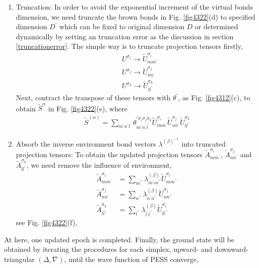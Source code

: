 \begin{enumerate}
	\item Truncation: In order to avoid the exponential increment of the virtual bonds dimension, we need truncate the brown bonds in Fig. \ref{fig4322}(d) to specified dimension $D^{\prime}$ which can be fixed to original dimension $D$ or determined dynamically by setting an truncation error as the discussion in section \ref{truncationerror}. The simple way is to truncate projection tensors firstly,  
		\begin{align}
			&U^{\sigma_i} \rightarrow \widetilde{U}^{\sigma_i}_{mm^{\prime}} \\
			&U^{\sigma_j} \rightarrow \widetilde{U}^{\sigma_j}_{nn^{\prime}} \\
			&U^{\sigma_k} \rightarrow \widetilde{U}^{\sigma_k}_{ll^{\prime}}
		\end{align}
		Next, contract the transpose of these tensors with $\theta^{\prime}$, as Fig. \ref{fig4312}(c), to obtain $\widetilde{S}^{\alpha}$ in Fig. \ref{fig4322}(e), where
		\begin{align}
			\widetilde{S}^{(\alpha)} = \sum_{m^{\prime}n^{\prime}l^{\prime}}{\theta_{m^{\prime} n^{\prime} l^{\prime}}^{\prime \sigma_i \sigma_j \sigma_k} \widetilde{U}^{\sigma_i}_{mm^{\prime}} \widetilde{U}^{\sigma_j}_{nn^{\prime}} \widetilde{U}^{\sigma_k}_{ll^{\prime}}}
		\end{align}
	\item Absorb the inverse environment bond vectors $\lambda^{(\beta)^{-1}}$ into truncated projection tensors: To obtain the updated projection tensors $\widetilde{A}^{\sigma_i}_{mm^{\prime}}$, $\widetilde{A}^{\sigma_j}_{nn^{\prime}}$ and $\widetilde{A}^{\sigma_k}_{ll^{\prime}}$, we need remove the influence of environment, 
		\begin{align}
			\widetilde{A}^{\sigma_i}_{mm^{\prime}} &= \sum_{m^{\prime \prime}}{ \lambda^{(\beta)}_{m^{\prime} m^{\prime \prime}} \widetilde{U}^{\sigma_i}_{mm^{\prime \prime}}} \\
			\widetilde{A}^{\sigma_j}_{nn^{\prime}} &= \sum_{n^{\prime \prime}}{ \lambda^{(\beta)}_{n^{\prime} n^{\prime \prime}} \widetilde{U}^{\sigma_j}_{nn^{\prime \prime}}} \\
			\widetilde{A}^{\sigma_k}_{ll^{\prime}} &= \sum_{l^{\prime \prime}}{ \lambda^{(\beta)}_{l^{\prime} l^{\prime \prime}} \widetilde{U}^{\sigma_i}_{ll^{\prime \prime}}}
		\end{align}	
		see Fig. \ref{fig4322}(f),
\end{enumerate}

At here, one updated epoch is completed. Finally, the ground state will be obtained by iterating the procedures for each simplex, upward- and downward- triangular $(\Delta, \nabla)$, until the wave function of PESS converge,

